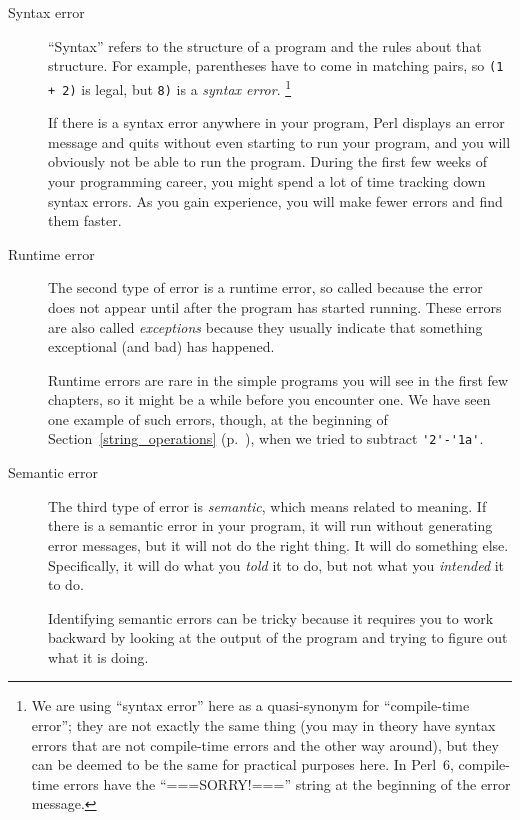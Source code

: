 \begin{description}

\item[Syntax error] ``Syntax'' refers to the structure of a program
  and the rules about that structure.  For example, parentheses have
  to come in matching pairs, so {\tt (1 + 2)} is legal, but 
{\tt 8)} is a \emph{syntax error}. \footnote{We are using 
``syntax error'' here as a quasi-synonym for ``compile-time error''; 
they are not exactly the same thing (you may in theory have 
syntax errors that are not compile-time errors and the other way 
around), but they can be deemed to be the same for 
practical purposes here. In Perl~6, compile-time errors 
have the ``===SORRY!==='' string at the beginning of 
the error message.}


If there is a syntax error
anywhere in your program, Perl displays an error message and quits 
without even starting to run your program, and you will 
obviously not be able to run the program.  During the first few
weeks of your programming career, you might spend a lot of
time tracking down syntax errors.  As you gain experience, you will
make fewer errors and find them faster.


\item[Runtime error] The second type of error is a runtime error, so
  called because the error does not appear until after the program has
  started running.  These errors are also called \emph{exceptions}
  because they usually indicate that something exceptional (and bad)
  has happened.   
    

Runtime errors are rare in the simple programs you will see in the
first few chapters, so it might be a while before you encounter one. 
We have seen one example of such errors, though, at the beginning 
of Section~\ref{string_operations} (p.~\pageref{string_operations}), 
when we tried to subtract \verb"'2'-'1a'". 


\item[Semantic error] The third type of error is \emph{semantic}, which
  means related to meaning.  If there is a semantic error in your
  program, it will run without generating error messages, but it will
  not do the right thing.  It will do something else.  Specifically,
  it will do what you \emph{told} it to do, but not what you 
  \emph{intended} it to do.
   

Identifying semantic errors can be tricky because it requires you to work
backward by looking at the output of the program and trying to figure
out what it is doing.

\end{description}


